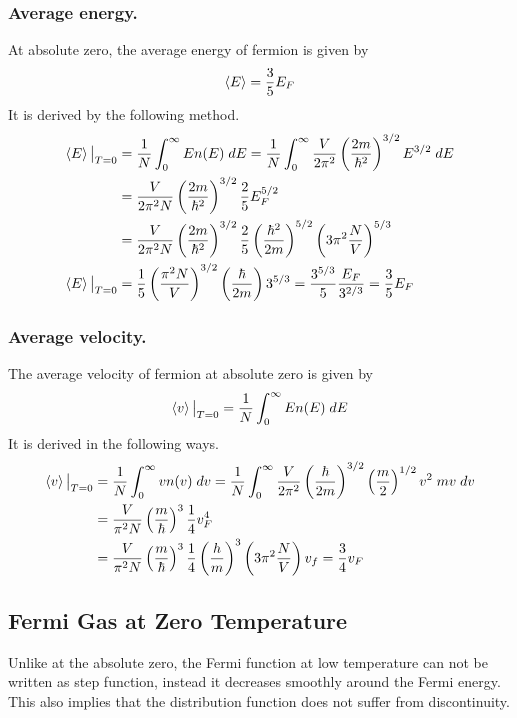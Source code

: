 \documentclass[../../../Main.tex]{subfiles}
\begin{document}
\subsubsection*{Average energy.} At absolute zero, the average energy of fermion is given by 
\begin{equation*}
    \braket{E}=\frac{3}{5}E_F
\end{equation*}
It is derived by the following method.
\begin{align*}
    \braket{E}\big|_{T=0}&= \frac{1}{N}\int_{0}^{\infty}En(E)\;dE =\frac{1}{N}\int_{0}^{\infty} \frac{V}{2\pi^2}\left(\frac{2m}{\hbar^2}\right)^{3/2}E^{3/2}\;dE\\
    &=\frac{V}{2\pi^2 N}\left(\frac{2m}{\hbar^2}\right)^{3/2}\frac{2}{5}E_F^{5/2}\\
    &=\frac{V}{2\pi^2 N}\left(\frac{2m}{\hbar^2}\right)^{3/2}\frac{2}{5}\left(\frac{\hbar^2}{2m}\right)^{5/2}\left(3\pi^2\frac{N}{V}\right)^{5/3}\\
    \braket{E}\big|_{T=0}&=\frac{1}{5}\left(\frac{\pi^2N}{V}\right)^{3/2}\left(\frac{\hbar}{2m}\right)3^{5/3}=\frac{3^{5/3}}{5}\frac{E_F}{3^{2/3}}=\frac{3}{5}E_F
\end{align*}

\subsubsection*{Average velocity.} The average velocity of fermion at absolute zero is given by 
\begin{equation*}
    \braket{v}\big|_{T=0}= \frac{1}{N}\int_{0}^{\infty}En(E)\;dE 
\end{equation*}
It is derived in the following ways.
\begin{align*}
    \braket{v}\big|_{T=0}&=\frac{1}{N}\int_{0}^{\infty}vn(v)\;dv=\frac{1}{N}\int_{0}^{\infty} \frac{V}{2\pi^2}\left(\frac{\hbar}{2m}\right)^{3/2}\left(\frac{m}{2}\right)^{1/2}v^2\;mv\;dv\\
    &=\frac{V}{\pi^2N}\left(\frac{m}{\hbar}\right)^3\frac{1}{4}v_F^4\\
    &=\frac{V}{\pi^2N}\left(\frac{m}{\hbar}\right)^3\frac{1}{4} \left(\frac{h}{m}\right)^3\left(3\pi^2\frac{N}{V}\right)v_f=\frac{3}{4}v_F
\end{align*}

\subsection*{Fermi Gas at Zero Temperature}
Unlike at the absolute zero, the Fermi function at low temperature can not be written as step function, instead it decreases smoothly around the Fermi energy. This also implies that the distribution function does not suffer from discontinuity.
\end{document}
